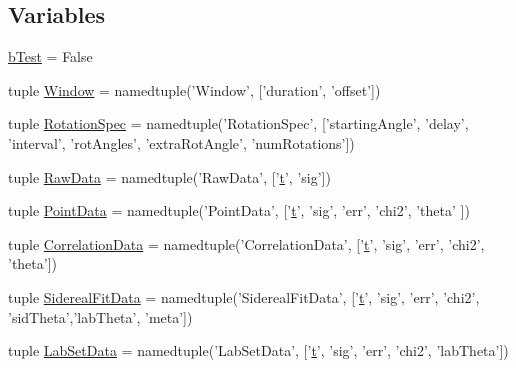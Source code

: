 \subsection*{Variables}
\begin{DoxyCompactItemize}
\item 
\hyperlink{namespacerepo_1_1programs_1_1pythonpackages_1_1pr_1_1SPfuncs_a47dc9e4b5eebaf862bdd545eaff5c371}{b\-Test} = False
\item 
tuple \hyperlink{namespacerepo_1_1programs_1_1pythonpackages_1_1pr_1_1SPfuncs_a5f881c246a0ac49955b33746df6c379b}{Window} = namedtuple('Window', \mbox{[}'duration', 'offset'\mbox{]})
\item 
tuple \hyperlink{namespacerepo_1_1programs_1_1pythonpackages_1_1pr_1_1SPfuncs_abeb96363789885a36812850590fbfbab}{Rotation\-Spec} = namedtuple('Rotation\-Spec', \mbox{[}'starting\-Angle', 'delay', 'interval', 'rot\-Angles', 'extra\-Rot\-Angle', 'num\-Rotations'\mbox{]})
\item 
tuple \hyperlink{namespacerepo_1_1programs_1_1pythonpackages_1_1pr_1_1SPfuncs_a29a04cecefb141502380f4e43bc1d06d}{Raw\-Data} = namedtuple('Raw\-Data', \mbox{[}'\hyperlink{namespacerepo_1_1programs_1_1pythonpackages_1_1pr_1_1SPfuncs_ae6715e84e2c13a885096710a851aba3a}{t}', 'sig'\mbox{]})
\item 
tuple \hyperlink{namespacerepo_1_1programs_1_1pythonpackages_1_1pr_1_1SPfuncs_a1ffb0a48d6d36a1260a65e82c4604ce2}{Point\-Data} = namedtuple('Point\-Data', \mbox{[}'\hyperlink{namespacerepo_1_1programs_1_1pythonpackages_1_1pr_1_1SPfuncs_ae6715e84e2c13a885096710a851aba3a}{t}', 'sig', 'err', 'chi2', 'theta' \mbox{]})
\item 
tuple \hyperlink{namespacerepo_1_1programs_1_1pythonpackages_1_1pr_1_1SPfuncs_a97ee543cf8ac7b27443cbfe8ff2e20f3}{Correlation\-Data} = namedtuple('Correlation\-Data', \mbox{[}'\hyperlink{namespacerepo_1_1programs_1_1pythonpackages_1_1pr_1_1SPfuncs_ae6715e84e2c13a885096710a851aba3a}{t}', 'sig', 'err', 'chi2', 'theta'\mbox{]})
\item 
tuple \hyperlink{namespacerepo_1_1programs_1_1pythonpackages_1_1pr_1_1SPfuncs_a8dd105859db0f7ebef805efb3c08dfb7}{Sidereal\-Fit\-Data} = namedtuple('Sidereal\-Fit\-Data', \mbox{[}'\hyperlink{namespacerepo_1_1programs_1_1pythonpackages_1_1pr_1_1SPfuncs_ae6715e84e2c13a885096710a851aba3a}{t}', 'sig', 'err', 'chi2', 'sid\-Theta','lab\-Theta', 'meta'\mbox{]})
\item 
tuple \hyperlink{namespacerepo_1_1programs_1_1pythonpackages_1_1pr_1_1SPfuncs_a98ebdcd3ceb3fa1b7bc74e8caf64b50d}{Lab\-Set\-Data} = namedtuple('Lab\-Set\-Data', \mbox{[}'\hyperlink{namespacerepo_1_1programs_1_1pythonpackages_1_1pr_1_1SPfuncs_ae6715e84e2c13a885096710a851aba3a}{t}', 'sig', 'err', 'chi2', 'lab\-Theta'\mbox{]})

\end{DoxyCompactItemize}

